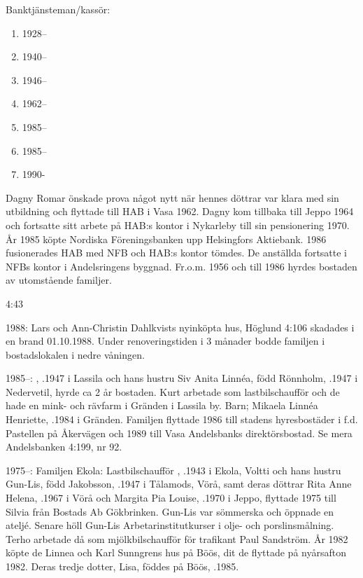 Banktjänsteman/kassör:
\begin{enumerate}
  \item 1928--  
  \item 1940--  
  \item 1946--	
  \item 1962--  
  \item 1985--  
  \item 1985--	
  \item 1990- 	  
\end{enumerate}

Dagny Romar önskade prova något nytt när hennes döttrar var klara med sin utbildning och flyttade till HAB i Vasa 1962. Dagny kom tillbaka till Jeppo 1964 och fortsatte sitt arbete på HAB:s kontor i Nykarleby till sin pensionering 1970. År 1985 köpte Nordiska Föreningsbanken upp Helsingfors Aktiebank. 1986 fusionerades HAB med NFB och HAB:s kontor tömdes. De anställda fortsatte i NFBs kontor i Andelsringens byggnad. Fr.o.m. 1956 och till 1986 hyrdes bostaden av utomstående familjer.

 4:43

1988:
Lars och Ann-Christin Dahlkvists nyinköpta hus, Höglund 4:106 skadades i en brand 01.10.1988. Under renoveringstiden i 3 månader bodde familjen i bostadslokalen i nedre våningen.


1985--:
, .1947 i Lassila och hans hustru Siv Anita Linnéa, född Rönnholm, .1947 i Nedervetil, hyrde ca 2 år bostaden. Kurt arbetade som lastbilschaufför och de hade en mink- och rävfarm i Gränden i Lassila by. Barn; Mikaela Linnéa Henriette, .1984 i Gränden. Familjen flyttade 1986 till stadens hyresbostäder i f.d. Pastellen på Åkervägen och 1989 till Vasa Andelsbanks direktörsbostad. Se mera Andelsbanken 4:199, nr 92.


1975--:
Familjen Ekola:	Lastbilschaufför , .1943 i Ekola, Voltti och hans hustru Gun-Lis, född Jakobsson, .1947 i Tålamods, Vörå, samt deras döttrar Rita Anne Helena, .1967 i Vörå och Margita Pia Louise, .1970 i Jeppo, flyttade 1975 till Silvia från Bostads Ab	Gökbrinken. Gun-Lis var sömmerska och öppnade en ateljé. Senare höll Gun-Lis Arbetarinstitutkurser i olje- och porslinsmålning. Terho arbetade då som mjölkbilschaufför för trafikant Paul Sandström. År 1982 köpte de Linnea och Karl Sunngrens hus på Böös, dit de flyttade på nyårsafton 1982. Deras tredje dotter, Lisa, föddes på Böös, .1985.



